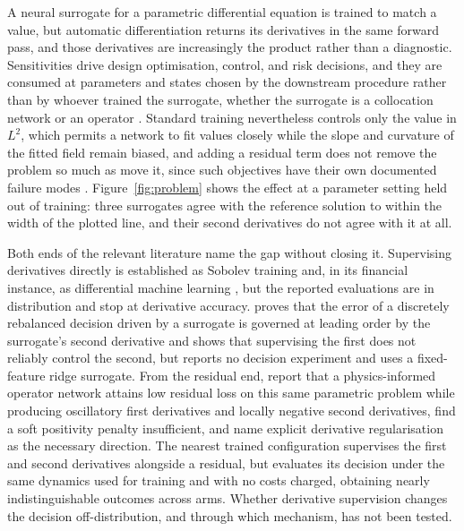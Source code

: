 \documentclass{article}
\begin{document}
A neural surrogate for a parametric differential equation is trained to match a
value, but automatic differentiation returns its derivatives in the same forward
pass, and those derivatives are increasingly the product rather than a
diagnostic. Sensitivities drive design optimisation, control, and risk
decisions, and they are consumed at parameters and states chosen by the
downstream procedure rather than by whoever trained the surrogate, whether the
surrogate is a collocation network \citep{raissi2019physics} or an operator
\citep{lu2021learning}. Standard
training nevertheless controls only the value in $L^{2}$, which permits a network
to fit values closely while the slope and curvature of the fitted field remain
biased, and adding a residual term does not remove the problem so much as move it,
since such objectives have their own documented failure modes
\citep{krishnapriyan2021characterizing}. Figure~\ref{fig:problem} shows the effect at a parameter setting held out
of training: three surrogates agree with the reference solution to within the
width of the plotted line, and their second derivatives do not agree with it at
all.

Both ends of the relevant literature name the gap without closing it. Supervising
derivatives directly is established as Sobolev training
\citep{czarnecki2017sobolev} and, in its financial instance, as differential
machine learning \citep{huge2020differential}, but the reported evaluations are
in distribution and stop at derivative accuracy.
\citet{noguer2026derivative} proves that the error of a discretely rebalanced
decision driven by a surrogate is governed at leading order by the surrogate's
second derivative and shows that supervising the first does not reliably control
the second, but reports no decision experiment and uses a fixed-feature ridge
surrogate. From the residual end, \citet{chakhoyan2025deepsvm} report that a
physics-informed operator network attains low residual loss on this same
parametric problem while producing oscillatory first derivatives and locally
negative second derivatives, find a soft positivity penalty insufficient, and
name explicit derivative regularisation as the necessary direction. The nearest
trained configuration \citep{sakuma2026a} supervises the first and second
derivatives alongside a residual, but evaluates its decision under the same
dynamics used for training and with no costs charged, obtaining nearly
indistinguishable outcomes across arms. Whether derivative supervision changes
the decision off-distribution, and through which mechanism, has not been tested.
\end{document}
